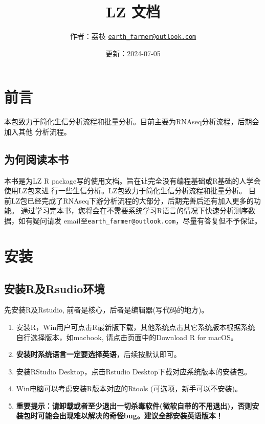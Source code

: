\documentclass[
]{book}
\title{LZ 文档}
\author{作者：荔枝 \href{mailto:earth_farmer@outlook.com}{\nolinkurl{earth\_farmer@outlook.com}}}
\date{更新：2024-07-05}
\providecommand{\tightlist}{%
  \setlength{\itemsep}{0pt}\setlength{\parskip}{0pt}}
\begin{document}
\maketitle

{
\setcounter{tocdepth}{1}
\tableofcontents
}
\chapter*{前言}\label{ux524dux8a00}

本包致力于简化生信分析流程和批量分析。目前主要为RNAseq分析流程，后期会加入其他
分析流程。

\section*{为何阅读本书}\label{ux4e3aux4f55ux9605ux8bfbux672cux4e66}

本书是为LZ R package写的使用文档。旨在让完全没有编程基础或R基础的人学会使用LZ包来进
行一些生信分析。LZ包致力于简化生信分析流程和批量分析。
目前LZ包已经完成了RNAseq下游分析流程的大部分，后期完善后还有加入更多的功能。
通过学习完本书，您将会在不需要系统学习R语言的情况下快速分析测序数据，如有疑问请发
email至\texttt{earth\_farmer@outlook.com}，尽量有答复但不予保证。

\chapter{安装}\label{install}

\section{安装R及Rsudio环境}\label{ux5b89ux88c5rux53carsudioux73afux5883}

先安装R及Rstudio, 前者是核心，后者是编辑器(写代码的地方)。

\begin{enumerate}
\def\labelenumi{\arabic{enumi}.}
\tightlist
\item
  安装R，Win用户可点击R最新版下载，其他系统点击其它系统版本根据系统自行选择版本，如macbook, 请点击页面中的Download R for macOS。
\item
  \textbf{安装时系统语言一定要选择英语}，后续按默认即可。
\item
  安装RStudio Desktop，点击Rstudio Desktop下载对应系统版本的安装包。
\item
  Win电脑可以考虑安装R版本对应的Rtools (可选项，新手可以不安装)。
\item
  \textbf{重要提示：请卸载或者至少退出一切杀毒软件(微软自带的不用退出)，否则安装包时可能会出现难以解决的奇怪bug。建议全部安装英语版本！}
\end{enumerate}
\end{document}
